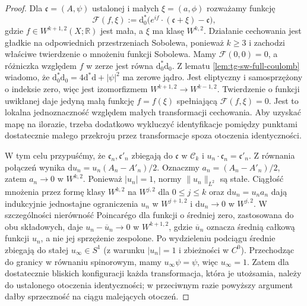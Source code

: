 \begin{proof}
Dla $\mathfrak c=(A,\psi)$ ustalonej i małych
$\xi=(a,\phi)$ rozważamy funkcję
\[
\mathcal F(f,\xi):=\mathrm d_0^*
\bigl(e^{if}\cdot(\mathfrak c+\xi)-\mathfrak c\bigr),
\]
gdzie $f\in W^{k+1,2}(X;\mathbb R)$ jest mała, a $\xi$
ma klasę $W^{k,2}$. Działanie cechowania jest gładkie
na odpowiednich przestrzeniach Sobolewa, ponieważ $k\ge3$
i zachodzi właściwe twierdzenie o mnożeniu funkcji Sobolewa.
Mamy $\mathcal F(0,0)=0$, a różniczka względem $f$
w zerze jest równa $\mathrm d_0^*\mathrm d_0$.
Z lematu \ref{lem:tg-sw-full-coulomb} wiadomo, że
$\mathrm d_0^*\mathrm d_0=4\mathrm d^*\mathrm d+|\psi|^2$
ma zerowe jądro. Jest eliptyczny i samosprzężony o indeksie
zero, więc jest izomorfizmem
$W^{k+1,2}\to W^{k-1,2}$.
Twierdzenie o funkcji uwikłanej daje jedyną małą funkcję
$f=f(\xi)$ spełniającą $\mathcal F(f,\xi)=0$.
Jest to lokalna jednoznaczność względem małych
transformacji cechowania. Aby uzyskać mapę na ilorazie,
trzeba dodatkowo wykluczyć identyfikacje pomiędzy
punktami dostatecznie małego przekroju przez
transformacje spoza otoczenia identyczności.

W tym celu przypuśćmy, że $\mathfrak c_n,\mathfrak c'_n$
zbiegają do $\mathfrak c$ w $\mathcal C_k$ i
$u_n\cdot\mathfrak c_n=\mathfrak c'_n$.
Z równania połączeń wynika
$\mathrm du_n=u_n(A_n-A'_n)/2$.
Oznaczmy $a_n=(A_n-A'_n)/2$, zatem $a_n\to0$
w $W^{k,2}$. Ponieważ $|u_n|=1$,
normy $\|u_n\|_{L^2}$ są stałe.
Ciągłość mnożenia przez formę klasy $W^{k,2}$
na $W^{j,2}$ dla $0\le j\le k$ oraz
$\mathrm du_n=u_na_n$ dają indukcyjnie
jednostajne ograniczenia $u_n$ w $W^{j+1,2}$
i $\mathrm du_n\to0$ w $W^{j,2}$.
W szczególności nierówność Poincarégo dla funkcji
o średniej zero, zastosowana do obu składowych,
daje $u_n-\overline u_n\to0$ w $W^{k+1,2}$,
gdzie $\overline u_n$ oznacza średnią całkową
funkcji $u_n$, a nie jej sprzężenie zespolone.
Po wydzieleniu podciągu średnie zbiegają
do stałej $u_\infty\in S^1$ (z warunku $|u_n|=1$
i zbieżności w $C^0$).
Przechodząc do granicy w równaniu spinorowym,
mamy $u_\infty\psi=\psi$, więc $u_\infty=1$.
Zatem dla dostatecznie bliskich konfiguracji
każda transformacja, która je utożsamia,
należy do ustalonego otoczenia identyczności;
w przeciwnym razie powyższy argument dałby
sprzeczność na ciągu malejących otoczeń.


\end{proof}
